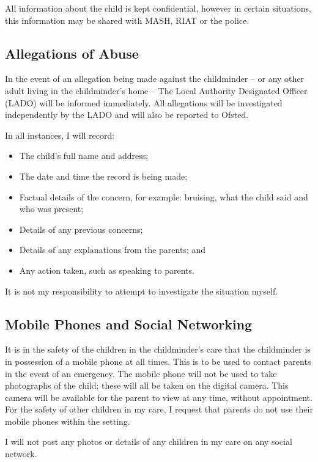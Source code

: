 All information about the child is kept confidential, however in certain
situations, this information may be shared with MASH, RIAT or the
police.

\subsection{Allegations of Abuse}

In the event of an allegation being made against the childminder -- or
any other adult living in the childminder's home -- The Local Authority
Designated Officer (LADO) will be informed immediately. All allegations
will be investigated independently by the LADO and will also be reported
to Ofsted.

In all instances, I will record:

\begin{itemize}
\item
  The child's full name and address;
\item
  The date and time the record is being made;
\item
  Factual details of the concern, for example: bruising, what the
  child said and who was present;
\item
  Details of any previous concerns;
\item
  Details of any explanations from the parents; and
\item
  Any action taken, such as speaking to parents.
\end{itemize}

It is not my responsibility to attempt to investigate the situation
myself.

\subsection{Mobile Phones and Social Networking}

It is in the safety of the children in the childminder's care that the
childminder is in possession of a mobile phone at all times. This is to
be used to contact parents in the event of an emergency. The mobile
phone will not be used to take photographs of the child; these will all
be taken on the digital camera. This camera will be available for the
parent to view at any time, without appointment. For the safety of other
children in my care, I request that parents do not use their mobile
phones within the setting.

I will not post any photos or details of any children in my care on any
social network.


